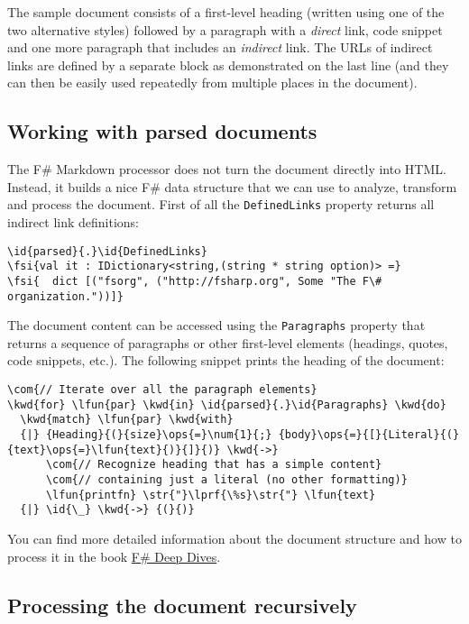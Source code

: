 \documentclass{article}
\newcommand{\id}[1]{\textcolor{black}{#1}}
\newcommand{\com}[1]{\textcolor{officegreen}{#1}}
\newcommand{\kwd}[1]{\textcolor{navy}{#1}}
\newcommand{\num}[1]{\textcolor{officegreen}{#1}}
\newcommand{\ops}[1]{\textcolor{purple}{#1}}
\newcommand{\str}[1]{\textcolor{olive}{#1}}
\newcommand{\fsi}[1]{\textcolor{outputcolor}{#1}}
\begin{document}
The sample document consists of a first-level heading (written using
one of the two alternative styles) followed by a paragraph with a
\emph{direct} link, code snippet and one more paragraph that includes an
\emph{indirect} link. The URLs of indirect links are defined by a separate
block as demonstrated on the last line (and they can then be easily used repeatedly
from multiple places in the document).
\subsection*{Working with parsed documents}



The F\# Markdown processor does not turn the document directly into HTML.
Instead, it builds a nice F\# data structure that we can use to analyze,
transform and process the document. First of all the \texttt{DefinedLinks} property
returns all indirect link definitions:
\begin{Verbatim}[commandchars=\\\{\}]
\id{parsed}{.}\id{DefinedLinks}
\fsi{val it : IDictionary<string,(string * string option)> =}
\fsi{  dict [("fsorg", ("http://fsharp.org", Some "The F\# organization."))]}
\end{Verbatim}



The document content can be accessed using the \texttt{Paragraphs} property that returns
a sequence of paragraphs or other first-level elements (headings, quotes, code snippets, etc.).
The following snippet prints the heading of the document:
\begin{Verbatim}[commandchars=\\\{\}]
\com{// Iterate over all the paragraph elements}
\kwd{for} \lfun{par} \kwd{in} \id{parsed}{.}\id{Paragraphs} \kwd{do}
  \kwd{match} \lfun{par} \kwd{with}
  {|} {Heading}{(}{size}\ops{=}\num{1}{;} {body}\ops{=}{[}{Literal}{(}{text}\ops{=}\lfun{text}{)}{]}{)} \kwd{->} 
      \com{// Recognize heading that has a simple content}
      \com{// containing just a literal (no other formatting)}
      \lfun{printfn} \str{"}\lprf{\%s}\str{"} \lfun{text}
  {|} \id{\_} \kwd{->} {(}{)}
\end{Verbatim}



You can find more detailed information about the document structure and how to process it
in the book \href{http://manning.com/petricek2/}{F\# Deep Dives}.
\subsection*{Processing the document recursively}
\end{document}
